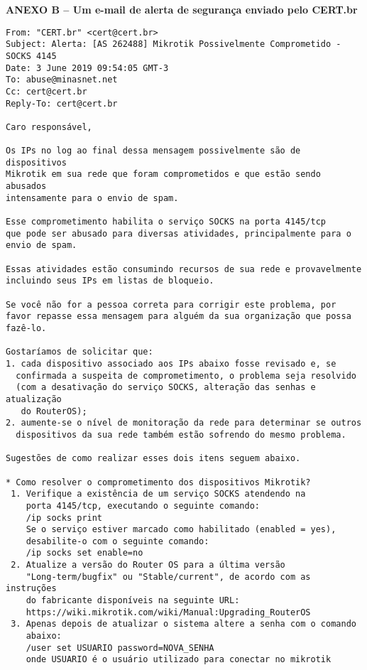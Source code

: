 \begin{center}
  \normalsize{\textbf{ANEXO B -- Um e-mail de alerta de segurança enviado pelo CERT.br}}
\end{center}

\pagestyle{empty} %

\begin{verbatim}
From: "CERT.br" <cert@cert.br>
Subject: Alerta: [AS 262488] Mikrotik Possivelmente Comprometido - SOCKS 4145
Date: 3 June 2019 09:54:05 GMT-3
To: abuse@minasnet.net
Cc: cert@cert.br
Reply-To: cert@cert.br

Caro responsável,

Os IPs no log ao final dessa mensagem possivelmente são de dispositivos
Mikrotik em sua rede que foram comprometidos e que estão sendo abusados
intensamente para o envio de spam.

Esse comprometimento habilita o serviço SOCKS na porta 4145/tcp
que pode ser abusado para diversas atividades, principalmente para o
envio de spam.

Essas atividades estão consumindo recursos de sua rede e provavelmente
incluindo seus IPs em listas de bloqueio.

Se você não for a pessoa correta para corrigir este problema, por
favor repasse essa mensagem para alguém da sua organização que possa
fazê-lo.

Gostaríamos de solicitar que:
1. cada dispositivo associado aos IPs abaixo fosse revisado e, se
  confirmada a suspeita de comprometimento, o problema seja resolvido
  (com a desativação do serviço SOCKS, alteração das senhas e atualização
   do RouterOS);
2. aumente-se o nível de monitoração da rede para determinar se outros
  dispositivos da sua rede também estão sofrendo do mesmo problema.

Sugestões de como realizar esses dois itens seguem abaixo.

* Como resolver o comprometimento dos dispositivos Mikrotik?
 1. Verifique a existência de um serviço SOCKS atendendo na
    porta 4145/tcp, executando o seguinte comando:
    /ip socks print
    Se o serviço estiver marcado como habilitado (enabled = yes),
    desabilite-o com o seguinte comando:
    /ip socks set enable=no
 2. Atualize a versão do Router OS para a última versão
    "Long-term/bugfix" ou "Stable/current", de acordo com as instruções
    do fabricante disponíveis na seguinte URL:
    https://wiki.mikrotik.com/wiki/Manual:Upgrading_RouterOS
 3. Apenas depois de atualizar o sistema altere a senha com o comando
    abaixo:
    /user set USUARIO password=NOVA_SENHA
    onde USUARIO é o usuário utilizado para conectar no mikrotik


\end{verbatim}
